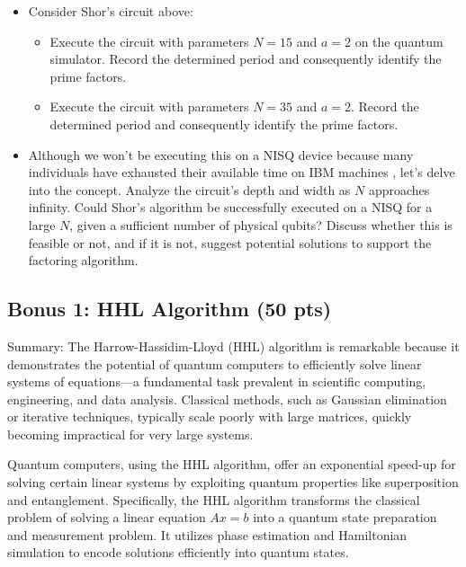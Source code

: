 \documentclass[12pt]{article}
\begin{document}
\begin{itemize}
   \item Consider Shor's circuit above:
   \begin{itemize}
      \item Execute the circuit with parameters $N=15$ and $a=2$ on the quantum simulator. Record the determined period and consequently identify the prime factors.
       \item Execute the circuit with parameters $N=35$ and $a=2$. Record the determined period and consequently identify the prime factors.
   \end{itemize}

    \item Although we won't be executing this on a NISQ device because many individuals have exhausted their available time on IBM machines \smiley{}, let's delve into the concept. Analyze the circuit's depth and width as $N$ approaches infinity. Could Shor's algorithm be successfully executed on a NISQ for a large $N$, given a sufficient number of physical qubits? Discuss whether this is feasible or not, and if it is not, suggest potential solutions to support the factoring algorithm.

\end{itemize}







\subsection*{Bonus 1: HHL Algorithm (50 pts)}
Summary: The Harrow-Hassidim-Lloyd (HHL) algorithm is remarkable because it demonstrates the potential of quantum computers to efficiently solve linear systems of equations—a fundamental task prevalent in scientific computing, engineering, and data analysis. Classical methods, such as Gaussian elimination or iterative techniques, typically scale poorly with large matrices, quickly becoming impractical for very large systems.

Quantum computers, using the HHL algorithm, offer an exponential speed-up for solving certain linear systems by exploiting quantum properties like superposition and entanglement. Specifically, the HHL algorithm transforms the classical problem of solving a linear equation $Ax=b$ into a quantum state preparation and measurement problem. It utilizes phase estimation and Hamiltonian simulation to encode solutions efficiently into quantum states.
\end{document}
